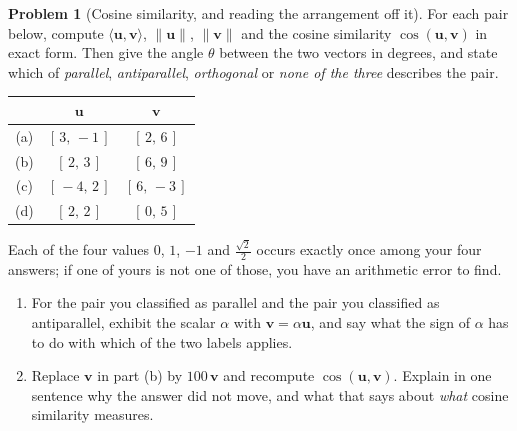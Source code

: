 \documentclass[11pt]{article}
\theoremstyle{definition}
\newtheorem{prob}{Problem}[section]
\newcommand{\vc}[1]{\mathbf{#1}}
\newcommand{\norm}[1]{\lVert #1\rVert}
\newcommand{\ip}[2]{\langle #1,#2\rangle}
\begin{document}
\begin{prob}[Cosine similarity, and reading the arrangement off it]
For each pair below, compute $\ip{\vc{u}}{\vc{v}}$, $\norm{\vc{u}}$,
$\norm{\vc{v}}$ and the cosine similarity $\cos(\vc{u},\vc{v})$ in exact form.
Then give the angle $\theta$ between the two vectors in degrees, and state which
of \emph{parallel}, \emph{antiparallel}, \emph{orthogonal} or \emph{none of the
three} describes the pair.

\begin{center}
\renewcommand{\arraystretch}{1.2}
\begin{tabular}{@{}c c c@{}}
\toprule
 & $\vc{u}$ & $\vc{v}$ \\
\midrule
(a) & $[\,3,\,-1\,]$  & $[\,2,\,6\,]$   \\
(b) & $[\,2,\,3\,]$   & $[\,6,\,9\,]$   \\
(c) & $[\,-4,\,2\,]$  & $[\,6,\,-3\,]$  \\
(d) & $[\,2,\,2\,]$   & $[\,0,\,5\,]$   \\
\bottomrule
\end{tabular}
\end{center}

\noindent Each of the four values $0$, $1$, $-1$ and $\tfrac{\sqrt2}{2}$ occurs
exactly once among your four answers; if one of yours is not one of those, you
have an arithmetic error to find.

\begin{enumerate}[label=\textbf{(\roman*)},leftmargin=2.6em,itemsep=7pt,topsep=6pt]
  \item For the pair you classified as parallel and the pair you classified as
        antiparallel, exhibit the scalar $\alpha$ with $\vc{v}=\alpha\vc{u}$,
        and say what the sign of $\alpha$ has to do with which of the two labels
        applies.
  \item Replace $\vc{v}$ in part (b) by $100\,\vc{v}$ and recompute
        $\cos(\vc{u},\vc{v})$. Explain in one sentence why the answer did not
        move, and what that says about \emph{what} cosine similarity measures.
\end{enumerate}
\end{prob}
\end{document}

